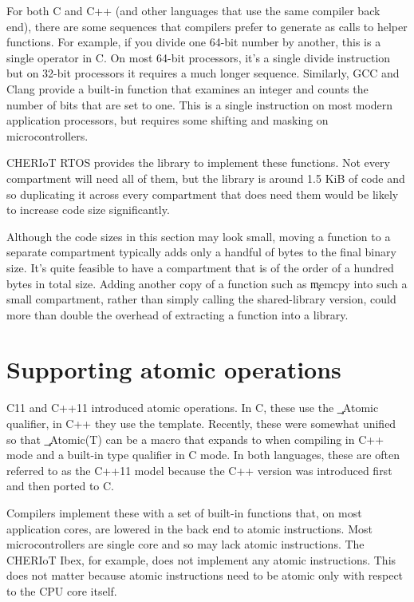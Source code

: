 For both C and C++ (and other languages that use the same compiler back end), there are some sequences that compilers prefer to generate as calls to helper functions.
For example, if you divide one 64-bit number by another, this is a single operator in C.
On most 64-bit processors, it's a single divide instruction but on 32-bit processors it requires a much longer sequence.
Similarly, GCC and Clang provide a  built-in function that examines an integer and counts the number of bits that are set to one.
This is a single instruction on most modern application processors, but requires some shifting and masking on microcontrollers.

CHERIoT RTOS provides the  library to implement these functions.
Not every compartment will need all of them, but the library is around 1.5 KiB of code and so duplicating it across every compartment that does need them would be likely to increase code size significantly.

Although the code sizes in this section may look small, moving a function to a separate compartment typically adds only a handful of bytes to the final binary size.
It's quite feasible to have a compartment that is of the order of a hundred bytes in total size.
Adding another copy of a function such as \c{memcpy} into such a small compartment, rather than simply calling the shared-library version, could more than double the overhead of extracting a function into a library.

\section{Supporting atomic operations}

C11 and C++11 introduced atomic operations.
In C, these use the \c{_Atomic} qualifier, in C++ they use the  template.
Recently, these were somewhat unified so that \c{_Atomic(T)} can be a macro that expands to  when compiling in C++ mode and a built-in type qualifier in C mode.
In both languages, these are often referred to as the C++11 model because the C++ version was introduced first and then ported to C.

Compilers implement these with a set of built-in functions that, on most application cores, are lowered in the back end to atomic instructions.
Most microcontrollers are single core and so may lack atomic instructions.
The CHERIoT Ibex, for example, does not implement any atomic instructions.
This does not matter because atomic instructions need to be atomic only with respect to the CPU core itself.

